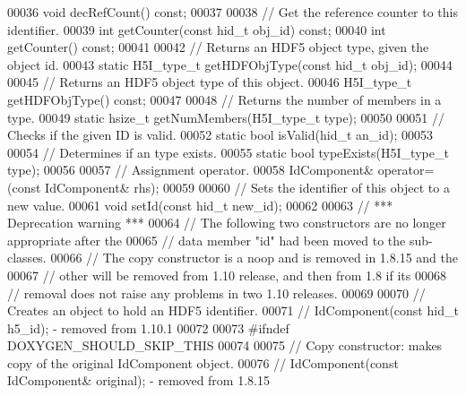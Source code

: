 \begin{DoxyCode}
00036         \textcolor{keywordtype}{void} decRefCount() \textcolor{keyword}{const};
00037 
00038         \textcolor{comment}{// Get the reference counter to this identifier.}
00039         \textcolor{keywordtype}{int} getCounter(\textcolor{keyword}{const} hid\_t obj\_id) \textcolor{keyword}{const};
00040         \textcolor{keywordtype}{int} getCounter() \textcolor{keyword}{const};
00041 
00042         \textcolor{comment}{// Returns an HDF5 object type, given the object id.}
00043         \textcolor{keyword}{static} H5I\_type\_t getHDFObjType(\textcolor{keyword}{const} hid\_t obj\_id);
00044 
00045         \textcolor{comment}{// Returns an HDF5 object type of this object.}
00046         H5I\_type\_t getHDFObjType() \textcolor{keyword}{const};
00047 
00048         \textcolor{comment}{// Returns the number of members in a type.}
00049         \textcolor{keyword}{static} hsize\_t getNumMembers(H5I\_type\_t type);
00050 
00051         \textcolor{comment}{// Checks if the given ID is valid.}
00052         \textcolor{keyword}{static} \textcolor{keywordtype}{bool} isValid(hid\_t an\_id);
00053 
00054         \textcolor{comment}{// Determines if an type exists.}
00055         \textcolor{keyword}{static} \textcolor{keywordtype}{bool} typeExists(H5I\_type\_t type);
00056 
00057         \textcolor{comment}{// Assignment operator.}
00058         IdComponent& operator=(\textcolor{keyword}{const} IdComponent& rhs);
00059 
00060         \textcolor{comment}{// Sets the identifier of this object to a new value.}
00061         \textcolor{keywordtype}{void} setId(\textcolor{keyword}{const} hid\_t new\_id);
00062 
00063         \textcolor{comment}{// *** Deprecation warning ***}
00064         \textcolor{comment}{// The following two constructors are no longer appropriate after the}
00065         \textcolor{comment}{// data member "id" had been moved to the sub-classes.}
00066         \textcolor{comment}{// The copy constructor is a noop and is removed in 1.8.15 and the}
00067         \textcolor{comment}{// other will be removed from 1.10 release, and then from 1.8 if its}
00068         \textcolor{comment}{// removal does not raise any problems in two 1.10 releases.}
00069 
00070         \textcolor{comment}{// Creates an object to hold an HDF5 identifier.}
00071         \textcolor{comment}{// IdComponent(const hid\_t h5\_id); - removed from 1.10.1}
00072 
00073 \textcolor{preprocessor}{#ifndef DOXYGEN\_SHOULD\_SKIP\_THIS}
00074 
00075         \textcolor{comment}{// Copy constructor: makes copy of the original IdComponent object.}
00076         \textcolor{comment}{// IdComponent(const IdComponent& original); - removed from 1.8.15}

\end{DoxyCode}
